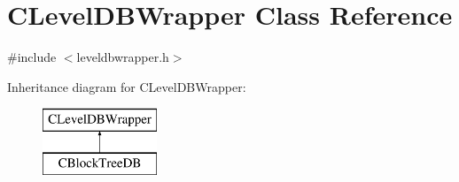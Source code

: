 \hypertarget{class_c_level_d_b_wrapper}{}\section{C\+Level\+D\+B\+Wrapper Class Reference}
\label{class_c_level_d_b_wrapper}


{\ttfamily \#include $<$leveldbwrapper.\+h$>$}

Inheritance diagram for C\+Level\+D\+B\+Wrapper\+:\begin{figure}[H]
\begin{center}
\leavevmode
\includegraphics[height=2.000000cm]{class_c_level_d_b_wrapper}
\end{center}
\end{figure}
